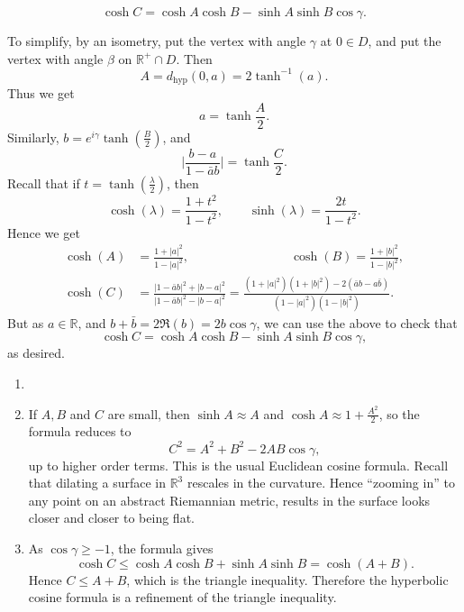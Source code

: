 \documentclass[12pt]{article}
\begin{document}
\begin{theorem}
	\[
	\cosh C = \cosh A \cosh B - \sinh A \sinh B \cos \gamma.
	\]
\end{theorem}
\begin{proofbox}
	To simplify, by an isometry, put the vertex with angle $\gamma$ at $0 \in D$, and put the vertex with angle $\beta$ on $\mathbb{R}^+ \cap D$. Then
	\[
		A = d_\mathrm{hyp}(0,a) = 2 \tanh^{-1}(a).
	\]
	Thus we get
	\[
	a = \tanh \frac{A}{2}.
	\]
	Similarly, $b = e^{i \gamma}\tanh( \frac{B}{2})$, and
	\[
	\biggl| \frac{b - a}{1 - \bar a b} \biggr| = \tanh \frac{C}{2}.
	\] 
	Recall that if $t = \tanh(\frac{\lambda}{2})$, then
	\[
	\cosh(\lambda) = \frac{1+t^2}{1-t^2}, \qquad \sinh(\lambda) = \frac{2t}{1 - t^2}.
	\]
	Hence we get
	\begin{align*}
		\cosh(A) &= \frac{1 + |a|^2}{1 - |a|^2}, \qquad \qquad \qquad \qquad \cosh(B) = \frac{1+|b|^2}{1-|b|^2},\\
		\cosh(C) &= \frac{|1 - \bar a b|^2 + |b - a|^2}{|1 - \bar a b|^2 - |b - a|^2} = \frac{(1+|a|^2)(1+|b|^2) - 2(\bar a b - a \bar b)}{(1 - |a|^2)(1 - |b|^2)}.
	\end{align*}
	But as $a \in \mathbb{R}$, and $b + \bar b = 2 \Re(b) = 2 b \cos \gamma$, we can use the above to check that
	\[
	\cosh C = \cosh A \cosh B - \sinh A \sinh B \cos \gamma,
	\]
	as desired.
\end{proofbox}

\begin{remark}
	\begin{enumerate}
		\item[]
		\item If $A, B$ and $C$ are small, then $\sinh A \approx A$ and $\cosh A \approx 1 + \frac{A^2}{2}$, so the formula reduces to
			\[
			C^2 = A^2 + B^2 - 2AB \cos \gamma,
			\]
			up to higher order terms. This is the usual Euclidean cosine formula. Recall that dilating a surface in $\mathbb{R}^3$ rescales in the curvature. Hence ``zooming in'' to any point on an abstract Riemannian metric, results in the surface looks closer and closer to being flat.
		\item As $\cos \gamma \ge -1$, the formula gives
			\[
			\cosh C \le \cosh A \cosh B + \sinh A \sinh B = \cosh (A + B).
			\]
			Hence $C \le A + B$, which is the triangle inequality. Therefore the hyperbolic cosine formula is a refinement of the triangle inequality.
	\end{enumerate}
\end{remark}
\end{document}
